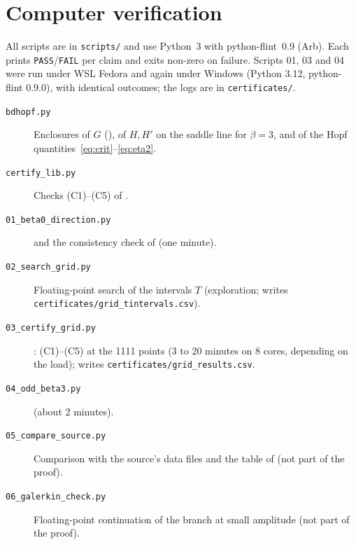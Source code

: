 \documentclass[11pt,a4paper]{report}
\begin{document}
\section{Computer verification}\label{sec:computer}
All scripts are in \texttt{scripts/} and use Python~3 with python-flint~0.9 (Arb). Each prints \texttt{PASS}/\texttt{FAIL} per claim and exits non-zero on failure. Scripts 01, 03 and 04 were run under WSL Fedora and again under Windows (Python 3.12, python-flint 0.9.0), with identical outcomes; the logs are in \texttt{certificates/}.
\begin{description}
\item[\texttt{bdhopf.py}] Enclosures of $G$ (), of $H,H'$ on the saddle line for $\beta=3$, and of the Hopf quantities~\eqref{eq:crit}--\eqref{eq:eta2}.
\item[\texttt{certify\_lib.py}] Checks (C1)--(C5) of .
\item[\texttt{01\_beta0\_direction.py}]  and the consistency check of  (one minute).
\item[\texttt{02\_search\_grid.py}] Floating-point search of the intervals $T$ (exploration; writes \texttt{certificates/grid\_tintervals.csv}).
\item[\texttt{03\_certify\_grid.py}] : (C1)--(C5) at the 1111 points (3 to 20 minutes on 8 cores, depending on the load); writes \texttt{certificates/grid\_results.csv}.
\item[\texttt{04\_odd\_beta3.py}]  (about 2 minutes).
\item[\texttt{05\_compare\_source.py}] Comparison with the source's data files and the table of  (not part of the proof).
\item[\texttt{06\_galerkin\_check.py}] Floating-point continuation of the branch at small amplitude (not part of the proof).
\end{description}

\paperreferences
\end{document}
